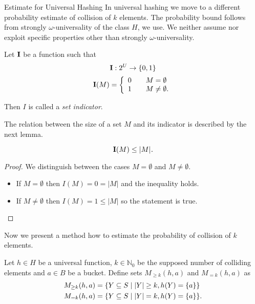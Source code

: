 \begin{section}{Estimate for Universal Hashing}
In universal hashing we move to a different probability estimate of collision of $k$ elements. The probability bound follows from strongly $\omega$-universality of the class $H$, we use. We neither assume nor exploit specific properties other than strongly $\omega$-universality.
\begin{definition}
Let $\mathbf{I}$ be a function such that
\begin{displaymath}
\mathbf{I}: 2^U \rightarrow \lbrace 0, 1 \rbrace
\end{displaymath}
\begin{displaymath}
\mathbf{I}(M) = \left\{ 
\begin{array}{l l}
  0 & \quad M = \emptyset \\
  1 & \quad M \neq \emptyset \text{.} \\
\end{array} \right. 
\end{displaymath}

Then $I$ is called a \emph{set indicator}.
\end{definition}

The relation between the size of a set $M$ and its indicator is described by the next lemma.
\begin{lemma}
\[\mathbf{I}(M) \leq |M| \textit{.} \]
\end{lemma}
\begin{proof} We distinguish between the cases $M = \emptyset$ and $M \neq \emptyset$.
\begin{itemize}
\item If $M = \emptyset$ then $I(M) = 0 = |M|$ and the inequality holds. 
\item If $M \neq \emptyset$ then $I(M) = 1 \leq |M|$ so the statement is true.
\end{itemize}
\end{proof}

Now we present a method how to estimate the probability of collision of $k$ elements.
\begin{definition}
Let $h \in H$ be a universal function, $k \in \mathbb{N}_0$ be the supposed number of colliding elements and $a \in B$ be a bucket. Define sets $M_{\geq k}(h, a)$ and $M_{= k}(h, a)$ as
\begin{displaymath}
\begin{split}
M_{\geq k}(h, a) & = \{Y \subseteq S \mid |Y| \geq k, h(Y) = \{a\}\} \\
M_{= k}(h, a) & = \{Y \subseteq S \mid |Y| = k, h(Y) = \{a\}\}  \text{.}
\end{split}
\end{displaymath}
\end{definition}


\end{section}
